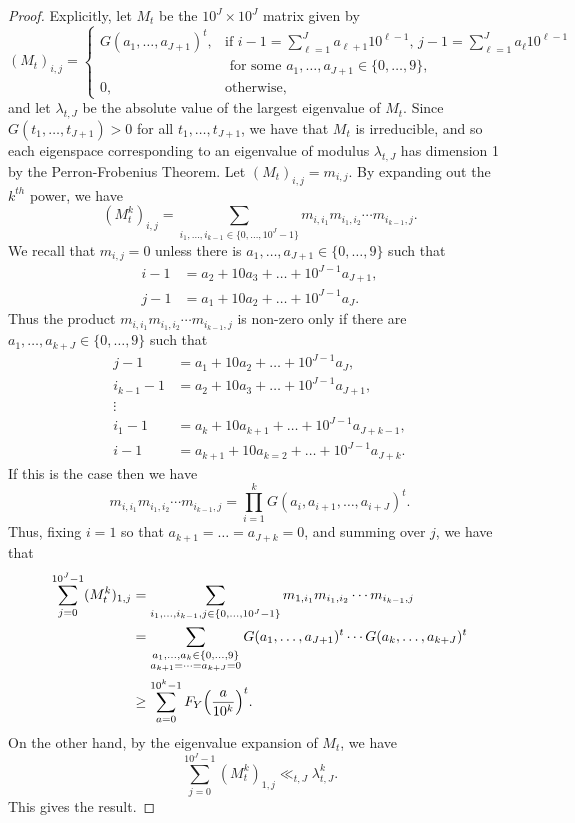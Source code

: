 \documentclass[10pt]{amsart}
\theoremstyle{plain}
\numberwithin{sblmm}{thrm}
\numberwithin{equation}{section}
\begin{document}
\begin{proof}
Explicitly, let $M_{t}$ be the $10^J\times10^J$ matrix given by
\[
(M_{t})_{i,j}=
\begin{cases}
G(a_1,\dots,a_{J+1})^t, &\text{if }i-1=\sum_{\ell=1}^J a_{\ell+1}10^{\ell-1},\, j-1=\sum_{\ell=1}^J a_\ell 10^{\ell-1}\\
&\text{ for some }a_1,\dots,a_{J+1}\in\{0,\dots, 9\},\\
0, &\text{otherwise,}
\end{cases}
\]
and let $\lambda_{t,J}$ be the absolute value of the largest eigenvalue of $M_t$. Since $G(t_1,\dots,t_{J+1})>0$ for all $t_1,\dots,t_{J+1}$, we have that $M_t$ is irreducible, and so each eigenspace corresponding to an eigenvalue of modulus $\lambda_{t,J}$ has dimension 1 by the Perron-Frobenius Theorem. Let $(M_t)_{i,j}=m_{i,j}$. By expanding out the $k^{th}$ power, we have
\[
(M_t^k)_{i,j}=\sum_{i_1,\dots,i_{k-1}\in\{0,\dots,10^J-1\}}m_{i,i_1}m_{i_1,i_2}\cdots m_{i_{k-1},j}.
\]
We recall that $m_{i,j}=0$ unless there is $a_1,\dots,a_{J+1}\in\{0,\dots,9\}$ such that
%
\begin{align*}
i-1&=a_2+10a_3+\dots+10^{J-1}a_{J+1},\\
j-1&=a_1+10a_2+\dots+10^{J-1}a_J.
\end{align*}
%
Thus the product $m_{i,i_1}m_{i_1,i_2}\cdots m_{i_{k-1},j}$ is non-zero only if there are $a_1,\dots,a_{k+J}\in\{0,\dots,9\}$ such that
%
\begin{align*}
j-1&=a_1+10a_2+\dots+10^{J-1}a_J,\\
i_{k-1}-1&=a_2+10a_3+\dots+10^{J-1}a_{J+1},\\
\vdots\\
i_1-1&=a_k+10a_{k+1}+\dots+10^{J-1}a_{J+k-1},\\
i-1&=a_{k+1}+10a_{k=2}+\dots+10^{J-1}a_{J+k}.
\end{align*}
%
If this is the case then we have
\[
m_{i,i_1}m_{i_1,i_2}\cdots m_{i_{k-1},j}=\prod_{i=1}^k G(a_i,a_{i+1},\dots,a_{i+J})^t.
\]
Thus, fixing $i=1$ so that $a_{k+1}=\dots=a_{J+k}=0$, and summing over $j$, we have that
%
\begin{align*}
\sum_{j=0}^{10^J-1}(M_{t}^k)_{1,j}&=\sum_{i_1,\dots,i_{k-1},j\in\{0,\dots,10^J-1\}}m_{1,i_1}m_{i_1,i_2}\cdots m_{i_{k-1},j}\\
&=\sum_{\substack{a_1,\dots,a_k\in\{0,\dots,9\}\\ a_{k+1}=\dots =a_{k+J}=0}}G(a_1,\dots,a_{J+1})^t\cdots G(a_k,\dots,a_{k+J})^t\\
&\ge \sum_{a=0}^{10^k-1}F_Y\Bigl(\frac{a}{10^k}\Bigr)^t.
\end{align*}
%
On the other hand, by the eigenvalue expansion of $M_{t}$, we have
\[
\sum_{j=0}^{10^J-1}(M_t^k)_{1,j}\ll_{t,J}\lambda_{t,J}^k.
\]
This gives the result.
\end{proof}
\end{document}
